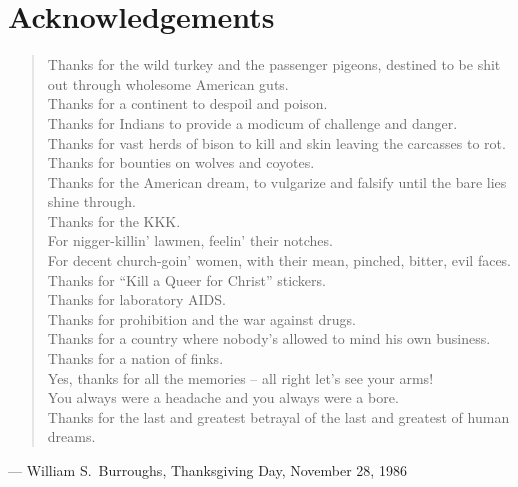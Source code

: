 \chapter*{Acknowledgements}

\begin{verse}
Thanks for the wild turkey and the passenger pigeons, destined to be shit out through wholesome American guts. 
\\
Thanks for a continent to despoil and poison. 
\\
Thanks for Indians to provide a modicum of challenge and danger. 
\\
Thanks for vast herds of bison to kill and skin leaving the carcasses to rot.
\\
Thanks for bounties on wolves and coyotes. 
\\
Thanks for the American dream, to vulgarize and falsify until the bare lies shine through. 
\\
Thanks for the KKK. 
\\
For nigger-killin' lawmen, feelin' their notches. 
\\
For decent church-goin' women, with their mean, pinched, bitter, evil faces. 
\\
Thanks for ``Kill a Queer for Christ'' stickers. 
\\
Thanks for laboratory AIDS. 
\\
Thanks for prohibition and the war against drugs. 
\\
Thanks for a country where nobody's allowed to mind his own business. 
\\
Thanks for a nation of finks. 
\\
Yes, thanks for all the memories -- all right let's see your arms! 
\\
You always were a headache and you always were a bore. 
\\
Thanks for the last and greatest betrayal of the last and greatest of human dreams. 
\end{verse}

\hfill{--- William S.\ Burroughs, Thanksgiving Day, November 28, 1986}
